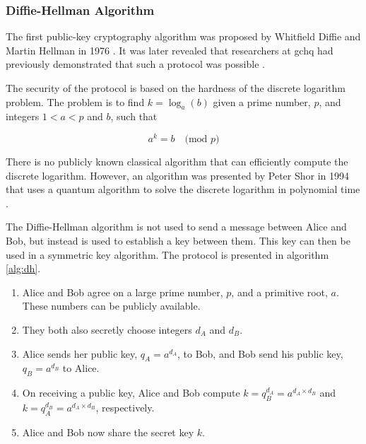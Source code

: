 

\subsubsection*{Diffie-Hellman Algorithm}

The first public-key cryptography algorithm was proposed by Whitfield Diffie and Martin Hellman in 1976 \cite{diffie1976new}. It was later revealed that researchers at \ac{gchq} had previously demonstrated that such a protocol was possible \cite{Ellis1970, williamson1974}.

The security of the protocol is based on the hardness of the discrete logarithm problem. The problem is to find $k = \log_a(b)$ given a prime number, $p$, and integers $1<a<p$ and $b$, such that

\begin{equation}
	a^k = b\quad\text{(mod } p\text{)}
\end{equation}

There is no publicly known classical algorithm that can efficiently compute the discrete logarithm. However, an algorithm was presented by Peter Shor in 1994 that uses a quantum algorithm to solve the discrete logarithm in polynomial time \cite{shor1994}.

The Diffie-Hellman algorithm is not used to send a message between Alice and Bob, but instead is used to establish a key between them. This key can then be used in a symmetric key algorithm. The protocol is presented in algorithm \ref{alg:dh}.

\begin{algorithm}
\label{alg:dh}
\begin{enumerate}
	\item Alice and Bob agree on a large prime number, $p$, and a primitive root, $a$. These numbers can be publicly available.
	\item They both also secretly choose integers $d_A$ and $d_B$.
	\item Alice sends her public key, $q_A = a^{d_A}$, to Bob, and Bob send his public key, $q_B = a^{d_B}$ to Alice.
	\item On receiving a public key, Alice and Bob compute $k = q_B^{d_A} = a^{d_A\times d_B}$ and $k = q_A^{d_B} = a^{d_A\times d_B}$, respectively.
	\item Alice and Bob now share the secret key $k$.
\end{enumerate}
\end{algorithm}

